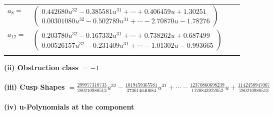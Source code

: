 \documentclass[1p]{elsarticle_modified}
\theoremstyle{definition}
\begin{document}
\begin{tabular}{m{7pt} m{180pt} m{7pt} m{180pt} }
\flushright $a_{8}=$&$\begin{pmatrix}0.442680 u^{32}-0.385581 u^{31}+\cdots+0.406459 u+1.30251\\0.00301080 u^{32}-0.502789 u^{31}+\cdots-2.70870 u-1.78276\end{pmatrix}$ \\
\flushright $a_{12}=$&$\begin{pmatrix}0.203780 u^{32}-0.167332 u^{31}+\cdots+0.738262 u+0.687499\\0.00526157 u^{32}-0.231409 u^{31}+\cdots-1.01302 u-0.993665\end{pmatrix}$\\&\end{tabular}
\flushleft \textbf{(ii) Obstruction class $= -1$}\\~\\
\flushleft \textbf{(iii) Cusp Shapes $= \frac{299977318733}{280210980513} u^{32}-\frac{1019459365581}{373614640684} u^{31}+\cdots-\frac{12370860698239}{1120843922052} u+\frac{1142458947067}{280210980513}$}\\~\\
\newpage\renewcommand{\arraystretch}{1}
\flushleft \textbf{(iv) u-Polynomials at the component}\newline \\
\end{document}

